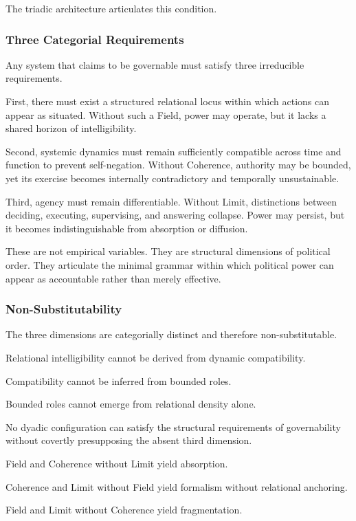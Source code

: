 \documentclass[12pt]{article}
\begin{document}
The triadic architecture articulates this condition.

\subsubsection{Three Categorial Requirements}


Any system that claims to be governable must satisfy three irreducible requirements.

First, there must exist a structured relational locus within which actions can appear as situated. Without such a Field, power may operate, but it lacks a shared horizon of intelligibility.

Second, systemic dynamics must remain sufficiently compatible across time and function to prevent self-negation. Without Coherence, authority may be bounded, yet its exercise becomes internally contradictory and temporally unsustainable.

Third, agency must remain differentiable. Without Limit, distinctions between deciding, executing, supervising, and answering collapse. Power may persist, but it becomes indistinguishable from absorption or diffusion.

These are not empirical variables. They are structural dimensions of political order. They articulate the minimal grammar within which political power can appear as accountable rather than merely effective.

\subsubsection{Non-Substitutability}


The three dimensions are categorially distinct and therefore non-substitutable.

Relational intelligibility cannot be derived from dynamic compatibility.

Compatibility cannot be inferred from bounded roles.

Bounded roles cannot emerge from relational density alone.

No dyadic configuration can satisfy the structural requirements of governability without covertly presupposing the absent third dimension.

Field and Coherence without Limit yield absorption.

Coherence and Limit without Field yield formalism without relational anchoring.

Field and Limit without Coherence yield fragmentation.
\end{document}
